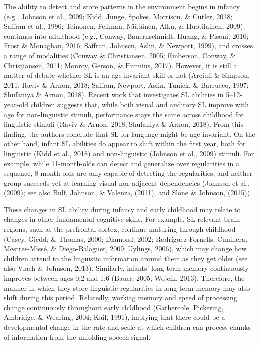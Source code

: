 \documentclass[
  english,
  man,floatsintext]{apa6}
\begin{document}
The ability to detect and store patterns in the environment begins in infancy (e.g., Johnson et al., 2009; Kidd, Junge, Spokes, Morrison, \& Cutler, 2018; Saffran et al., 1996; Teinonen, Fellman, Näätänen, Alku, \& Huotilainen, 2009), continues into adulthood (e.g., Conway, Bauernschmidt, Huang, \& Pisoni, 2010; Frost \& Monaghan, 2016; Saffran, Johnson, Aslin, \& Newport, 1999), and crosses a range of modalities (Conway \& Christiansen, 2005; Emberson, Conway, \& Christiansen, 2011; Monroy, Gerson, \& Hunnius, 2017). However, it is still a matter of debate whether SL is an age-invariant skill or not (Arciuli \& Simpson, 2011; Raviv \& Arnon, 2018; Saffran, Newport, Aslin, Tunick, \& Barrueco, 1997; Shufaniya \& Arnon, 2018). Recent work that investigates SL abilities in 5--12-year-old children suggests that, while both visual and auditory SL improve with age for non-linguistic stimuli, performance stays the same across childhood for linguistic stimuli (Raviv \& Arnon, 2018; Shufaniya \& Arnon, 2018). From this finding, the authors conclude that SL for language might be age-invariant. On the other hand, infant SL abilities do appear to shift within the first year, both for linguistic (Kidd et al., 2018) and non-linguistic (Johnson et al., 2009) stimuli. For example, while 11-month-olds can detect and generalize over regularities in a sequence, 8-month-olds are only capable of detecting the regularities, and neither group succeeds yet at learning visual non-adjacent dependencies (Johnson et al., (2009); see also Bulf, Johnson, \& Valenza, (2011), and Slone \& Johnson, (2015)).

These changes in SL ability during infancy and early childhood may relate to changes in other fundamental cognitive skills. For example, SL-relevant brain regions, such as the prefrontal cortex, continue maturing through childhood (Casey, Giedd, \& Thomas, 2000; Diamond, 2002; Rodríguez-Fornells, Cunillera, Mestres-Missé, \& Diego-Balaguer, 2009; Uylings, 2006), which may change how children attend to the linguistic information around them as they get older (see also Vlach \& Johnson, 2013). Similarly, infants' long-term memory continuously improves between ages 0;2 and 1;6 (Bauer, 2005; Wojcik, 2013). Therefore, the manner in which they store linguistic regularities in long-term memory may also shift during this period. Relatedly, working memory and speed of processing change continuously throughout early childhood (Gathercole, Pickering, Ambridge, \& Wearing, 2004; Kail, 1991), implying that there could be a developmental change in the rate and scale at which children can process chunks of information from the unfolding speech signal.
\end{document}
